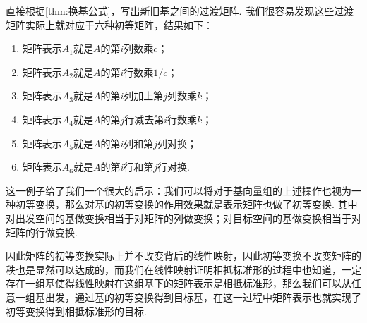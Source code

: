 \begin{solution}
    直接根据\autoref{thm:换基公式}，写出新旧基之间的过渡矩阵. 我们很容易发现这些过渡矩阵实际上就对应于六种初等矩阵，结果如下：
    \begin{enumerate}
        \item 矩阵表示$A_1$就是$A$的第$i$列数乘$c$；

        \item 矩阵表示$A_2$就是$A$的第$i$行数乘$1/c$；

        \item 矩阵表示$A_3$就是$A$的第$i$列加上第$j$列数乘$k$；

        \item 矩阵表示$A_4$就是$A$的第$j$行减去第$i$行数乘$k$；

        \item 矩阵表示$A_5$就是$A$的第$i$列和第$j$列对换；

        \item 矩阵表示$A_6$就是$A$的第$i$行和第$j$行对换.
    \end{enumerate}
\end{solution}

这一例子给了我们一个很大的启示：我们可以将对于基向量组的上述操作也视为一种初等变换，那么对基的初等变换的作用效果就是表示矩阵也做了初等变换. 其中对出发空间的基做变换相当于对矩阵的列做变换；对目标空间的基做变换相当于对矩阵的行做变换.

因此矩阵的初等变换实际上并不改变背后的线性映射，因此初等变换不改变矩阵的秩也是显然可以达成的，而我们在线性映射证明相抵标准形的过程中也知道，一定存在一组基使得线性映射在这组基下的矩阵表示是相抵标准形，那么我们可以从任意一组基出发，通过基的初等变换得到目标基，在这一过程中矩阵表示也就实现了初等变换得到相抵标准形的目标.



